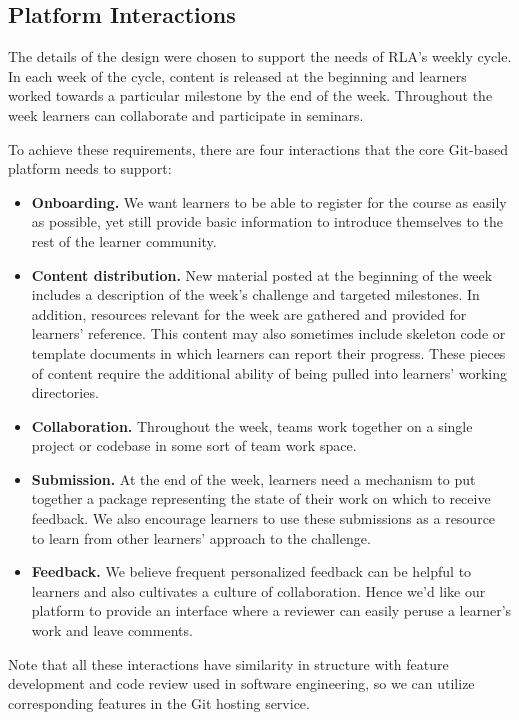 \documentclass[12pt,twoside,vi]{mitthesis}
\begin{document}
\subsection{Platform Interactions}

The details of the design were chosen to support the needs of RLA's weekly cycle. In each week of the cycle, content is released at the beginning and learners worked towards a particular milestone by the end of the week. Throughout the week learners can collaborate and participate in seminars.

To achieve these requirements, there are four interactions that the core Git-based platform needs to support:
\begin{itemize}
\item \textbf{Onboarding.} We want learners to be able to register for the course as easily as possible, yet still provide basic information to introduce themselves to the rest of the learner community. 
\item \textbf{Content distribution.} New material posted at the beginning of the week includes a description of the week's challenge and targeted milestones. In addition, resources relevant for the week are gathered and provided for learners' reference. This content may also sometimes include skeleton code or template documents in which learners can report their progress. These pieces of content require the additional ability of being pulled into learners' working directories.
\item \textbf{Collaboration.} Throughout the week, teams work together on a single project or codebase in some sort of team work space. 
\item \textbf{Submission.} At the end of the week, learners need a mechanism to put together a package representing the state of their work on which to receive feedback. We also encourage learners to use these submissions as a resource to learn from other learners' approach to the challenge.
\item \textbf{Feedback.} We believe frequent personalized feedback can be helpful to learners and also cultivates a culture of collaboration. Hence we'd like our platform to provide an interface where a reviewer can easily peruse a learner's work and leave comments. 
\end{itemize}
Note that all these interactions have similarity in structure with feature development and code review used in software engineering, so we can utilize corresponding features in the Git hosting service.
\end{document}
